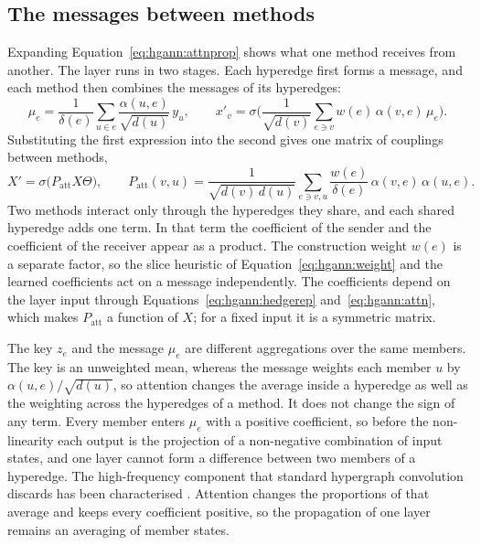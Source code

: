 \subsection*{The messages between methods}

Expanding Equation~\ref{eq:hgann:attnprop} shows what one method receives from another. The layer
runs in two stages. Each hyperedge first forms a message, and each method then combines the
messages of its hyperedges:
\begin{equation}
  \mu_e = \frac{1}{\delta(e)} \sum_{u \in e} \frac{\alpha(u,e)}{\sqrt{d(u)}}\, y_u ,
  \qquad
  x'_v = \sigma\biggl( \frac{1}{\sqrt{d(v)}} \sum_{e \ni v} w(e)\, \alpha(v,e)\, \mu_e \biggr) .
  \label{eq:hgann:messages}
\end{equation}
Substituting the first expression into the second gives one matrix of couplings between methods,
\begin{equation}
  X' = \sigma\bigl( P_{\text{att}} X \Theta \bigr) ,
  \qquad
  P_{\text{att}}(v,u) = \frac{1}{\sqrt{d(v)\, d(u)}} \sum_{e \ni v,u} \frac{w(e)}{\delta(e)}\,
  \alpha(v,e)\, \alpha(u,e) .
  \label{eq:hgann:coupling}
\end{equation}
Two methods interact only through the hyperedges they share, and each shared hyperedge adds one
term. In that term the coefficient of the sender and the coefficient of the receiver appear as a
product. The construction weight $w(e)$ is a separate factor, so the slice heuristic of
Equation~\ref{eq:hgann:weight} and the learned coefficients act on a message independently. The
coefficients depend on the layer input through Equations~\ref{eq:hgann:hedgerep}
and~\ref{eq:hgann:attn}, which makes $P_{\text{att}}$ a function of $X$; for a fixed input it is a
symmetric matrix.

The key $z_e$ and the message $\mu_e$ are different aggregations over the same members. The key is
an unweighted mean, whereas the message weights each member $u$ by $\alpha(u,e) / \sqrt{d(u)}$, so
attention changes the average inside a hyperedge as well as the weighting across the hyperedges of
a method. It does not change the sign of any term. Every member enters $\mu_e$ with a positive
coefficient, so before the non-linearity each output is the projection of a non-negative
combination of input states, and one layer cannot form a difference between two members of a
hyperedge. The high-frequency component that standard hypergraph convolution discards has been
characterised \cite{li2026highpass}. Attention changes the proportions of that average and keeps
every coefficient positive, so the propagation of one layer remains an averaging of member states.

